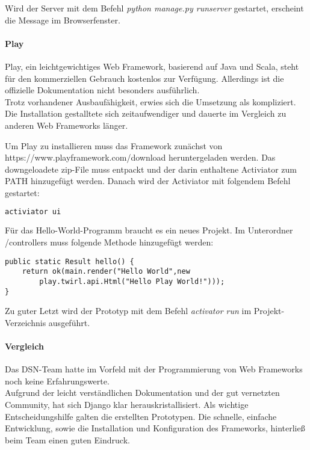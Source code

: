 Wird der Server mit dem Befehl \textit{python manage.py runserver} gestartet, erscheint die Message im Browserfenster.

\paragraph{Play}
Play, ein leichtgewichtiges Web Framework, basierend auf Java und Scala, steht für den kommerziellen Gebrauch kostenlos zur Verfügung. Allerdings ist die offizielle Dokumentation nicht besonders ausführlich.\\
Trotz vorhandener Ausbaufähigkeit, erwies sich die Umsetzung als kompliziert. Die Installation gestalltete sich zeitaufwendiger und dauerte im Vergleich zu anderen Web Frameworks länger.\cite{PLAY}

Um Play zu installieren muss das Framework zunächst von\\
https://www.playframework.com/download heruntergeladen werden. Das downgeloadete zip-File muss entpackt und der darin enthaltene Activiator zum PATH hinzugefügt werden. Danach wird der Activiator mit folgendem Befehl gestartet\cite{PLAYCON}:
\begin{lstlisting}[caption={Konifiguration von Play \cite{PLAYCON}}, language=bash]
activiator ui
\end{lstlisting}

Für das \grqq{}Hello-World\grqq{}-Programm braucht es ein neues Projekt. Im Unterordner /controllers muss folgende Methode hinzugefügt werden:

\begin{lstlisting}[caption={Play Hello-World \cite{PLAYCON}}]
public static Result hello() {
	return ok(main.render("Hello World",new
		play.twirl.api.Html("Hello Play World!")));
}
\end{lstlisting}

Zu guter Letzt wird der Prototyp mit dem Befehl \textit{activator run} im Projekt-Verzeichnis ausgeführt.

\paragraph{Vergleich}
Das DSN-Team hatte im Vorfeld mit der Programmierung von Web Frameworks noch keine Erfahrungswerte. \\
Aufgrund der leicht verständlichen Dokumentation und der gut vernetzten Community, hat sich Django klar herauskristallisiert. Als wichtige Entscheidungshilfe galten die erstellten Prototypen. Die schnelle, einfache Entwicklung, sowie die Installation und Konfiguration des Frameworks, hinterließ beim Team einen guten Eindruck.

